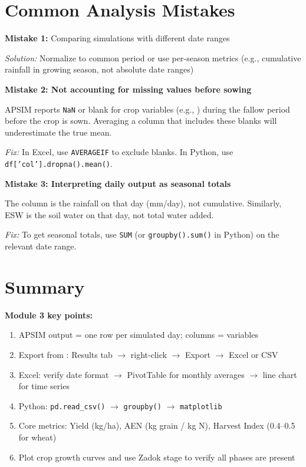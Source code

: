 \section{Common Analysis Mistakes}

\begin{warningbox}
\textbf{Mistake 1:} Comparing simulations with different date ranges

\textit{Solution:} Normalize to common period or use per-season metrics (e.g., cumulative rainfall in growing season, not absolute date ranges)
\end{warningbox}

\begin{warningbox}
\textbf{Mistake 2: Not accounting for missing values before sowing}

APSIM reports \texttt{NaN} or blank for crop variables (e.g., ) during the fallow period before the crop is sown. Averaging a column that includes these blanks will underestimate the true mean.

\textit{Fix:} In Excel, use \texttt{AVERAGEIF} to exclude blanks. In Python, use \texttt{df['col'].dropna().mean()}.
\end{warningbox}

\begin{warningbox}
\textbf{Mistake 3: Interpreting daily output as seasonal totals}

The  column is the rainfall on that day (mm/day), not cumulative. Similarly, ESW is the soil water on that day, not total water added.

\textit{Fix:} To get seasonal totals, use \texttt{SUM} (or \texttt{groupby().sum()} in Python) on the relevant date range.
\end{warningbox}

\section{Summary}

\begin{keyconceptbox}
\textbf{Module 3 key points:}
\begin{enumerate}
  \item APSIM output = one row per simulated day; columns =  variables
  \item Export from : Results tab $\to$ right-click $\to$ Export $\to$ Excel or CSV
  \item Excel: verify date format $\to$ PivotTable for monthly averages $\to$ line chart for time series
  \item Python: \texttt{pd.read\_csv()} $\to$ \texttt{groupby()} $\to$ \texttt{matplotlib}
  \item Core metrics: Yield (kg/ha), AEN (kg grain / kg N), Harvest Index (0.4--0.5 for wheat)
  \item Plot crop growth curves and use Zadok stage to verify all phases are present
\end{enumerate}
\end{keyconceptbox}


